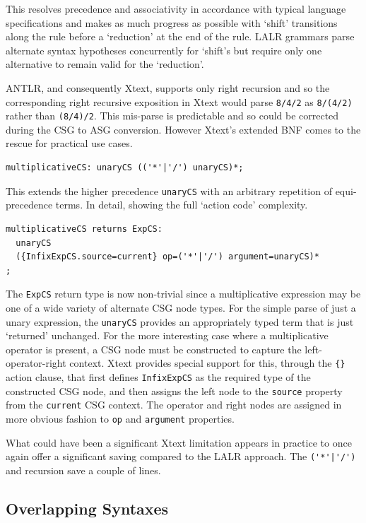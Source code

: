 \documentclass{eceasst}
\begin{document}
This resolves precedence and associativity in accordance with typical language specifications and makes as much progress as possible with `shift' transitions along the rule before a `reduction' at the end of the rule. LALR grammars parse alternate syntax hypotheses concurrently for `shift's but require only one alternative to remain valid for the `reduction'.

ANTLR, and consequently Xtext, supports only right recursion and so the corresponding right recursive exposition in Xtext would parse \verb+8/4/2+ as \verb+8/(4/2)+ rather than \verb+(8/4)/2+. This mis-parse is predictable and so could be corrected during the CSG to ASG conversion. However Xtext's extended BNF comes to the rescue for practical use cases.

{\small\begin{verbatim}
multiplicativeCS: unaryCS (('*'|'/') unaryCS)*;
\end{verbatim}}

This extends the higher precedence \verb+unaryCS+ with an arbitrary repetition of equi-precedence terms. In detail, showing the full `action code' complexity.

{\small\begin{verbatim}
multiplicativeCS returns ExpCS:
  unaryCS
  ({InfixExpCS.source=current} op=('*'|'/') argument=unaryCS)*
;
\end{verbatim}}

The \verb+ExpCS+ return type is now non-trivial since a multiplicative expression may be one of a wide variety of alternate CSG node types. For the simple parse of just a unary expression, the \verb+unaryCS+ provides an appropriately typed term that is just `returned' unchanged. For the more interesting case where a multiplicative operator is present, a CSG node must be constructed to capture the left-operator-right context. Xtext provides special support for this, through the \verb+{}+ action clause, that first defines \verb+InfixExpCS+ as the required type of the constructed CSG node, and then assigns the left node to the \verb+source+ property from the \verb+current+ CSG context. The operator and right nodes are assigned in more obvious fashion to \verb+op+ and \verb+argument+ properties.

What could have been a significant Xtext limitation appears in practice to once again offer a significant saving compared to the LALR approach. The \verb+('*'|'/')+ and recursion save a couple of lines.

\subsection{Overlapping Syntaxes}
\end{document}
